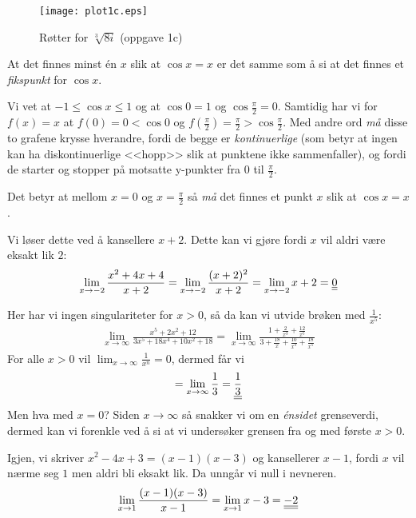\documentclass[a4paper,norsk,12pt]{article}
\begin{document}
\begin{figure}
\centering
\texttt{[image: plot1c.eps]}
\caption{Røtter for $\sqrt[3]{8i}$ (oppgave 1c)}
\label{plot.1c}
\end{figure}


At det finnes minst én $x$ slik at $\cos{x}=x$ er det samme som å si at det
finnes et \textit{fikspunkt} for $\cos{x}$.

Vi vet at $-1 \leq \cos{x} \leq 1$ og at $\cos{0} = 1$ og $\cos{\frac{\pi}{2}}
= 0$. Samtidig har vi for $f(x)=x$ at $f(0) = 0 < \cos{0}$ og $f(\frac{\pi}{2})
= \frac{\pi}{2} > \cos{\frac{\pi}{2}}$. Med andre ord \textit{må} disse to
grafene krysse hverandre, fordi de begge er \textit{kontinuerlige} (som betyr
at ingen kan ha diskontinuerlige <<hopp>> slik at punktene ikke sammenfaller),
og fordi de starter og stopper på motsatte y-punkter fra $0$ til
$\frac{\pi}{2}$.

Det betyr at mellom $x=0$ og $x=\frac{\pi}{2}$ så \textit{må} det finnes et punkt $x$
slik at $\cos{x} = x$.


Vi løser dette ved å kansellere $x+2$. Dette kan vi gjøre
fordi $x$ vil aldri være eksakt lik $2$:
\begin{equation*}
\begin{split}
  \lim_{x \to -2}{\frac{x^2+4x+4}{x+2}} = \lim_{x \to -2}{\frac{(x+2)^2}{x+2}}
  = \lim_{x \to -2}{x+2} = {\underline{\underline{0}}}
\end{split}
\end{equation*}

Her har vi ingen singulariteter for $x>0$, så da kan vi utvide brøken med
$\frac{1}{x^5}$:
\begin{equation*}
\begin{split}
  \lim_{x \to \infty}{\frac{x^5+2x^2+12}{3x^5+18x^4+10x^2+18}} =
    \lim_{x \to \infty}{
        \frac{
          1+\frac{2}{x^3}+\frac{12}{x^5}
        }{
          3+\frac{18}{x}+\frac{10}{x^3}+\frac{18}{x^5}
      }}
\end{split}
\end{equation*}
For alle $x>0$ vil $\lim_{x \to \infty}{\frac{1}{x^n}} = 0$, dermed får vi
\begin{equation*}
\begin{split}
  = \lim_{x \to \infty}{\frac{1}{3}} = {\underline{\underline{\frac{1}{3}}}}
\end{split}
\end{equation*}
Men hva med $x=0$? Siden $x\to\infty$ så snakker vi om en \textit{énsidet}
grenseverdi, dermed kan vi forenkle ved å si at vi undersøker grensen fra og
med første $x>0$.

Igjen, vi skriver $x^2-4x+3 = (x-1)(x-3)$ og kansellerer $x-1$, fordi $x$ vil
nærme seg $1$ men aldri bli eksakt lik. Da unngår vi null i nevneren.
\begin{equation*}
\begin{split}
  \lim_{x \to 1}{\frac{(x-1)(x-3)}{x-1}} =
  \lim_{x \to 1}{x-3} = {\underline{\underline{-2}}}
\end{split}
\end{equation*}
\end{document}
